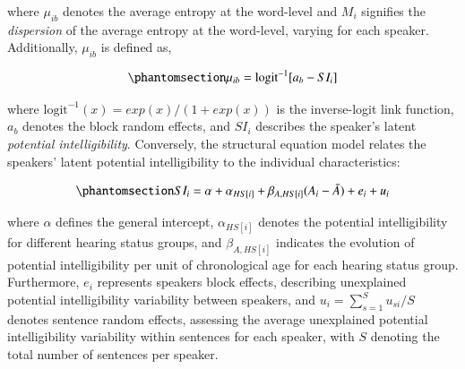 \documentclass[
  authoryear,
  preprint,
  1p]{elsarticle}
\begin{document}
where \(\mu_{ib}\) denotes the average entropy at the word-level and
\(M_{i}\) signifies the \emph{dispersion} of the average entropy at the
word-level, varying for each speaker. Additionally, \(\mu_{ib}\) is
defined as,

\begin{equation}\phantomsection\label{eq-beta-GLLAMM-linpred}{
\mu_{ib} = \text{logit}^{-1}[ a_{b} - SI_{i} ]
}\end{equation}

where \(\text{logit}^{-1}(x) = exp(x) / (1+exp(x))\) is the
inverse-logit link function, \(a_{b}\) denotes the block random effects,
and \(SI_{i}\) describes the speaker's latent \emph{potential
intelligibility}. Conversely, the structural equation model relates the
speakers' latent potential intelligibility to the individual
characteristics:

\begin{equation}\phantomsection\label{eq-beta-GLLAMM-structural}{
SI_{i} = \alpha + \alpha_{HS[i]} + \beta_{A, HS[i]} (A_{i} - \bar{A}) + e_{i} + u_{i}
}\end{equation}

where \(\alpha\) defines the general intercept, \(\alpha_{HS[i]}\)
denotes the potential intelligibility for different hearing status
groups, and \(\beta_{A,HS[i]}\) indicates the evolution of potential
intelligibility per unit of chronological age for each hearing status
group. Furthermore, \(e_{i}\) represents speakers block effects,
describing unexplained potential intelligibility variability between
speakers, and \(u_{i} = \sum_{s=1}^{S} u_{si}/S\) denotes sentence
random effects, assessing the average unexplained potential
intelligibility variability within sentences for each speaker, with
\(S\) denoting the total number of sentences per speaker.
\end{document}
